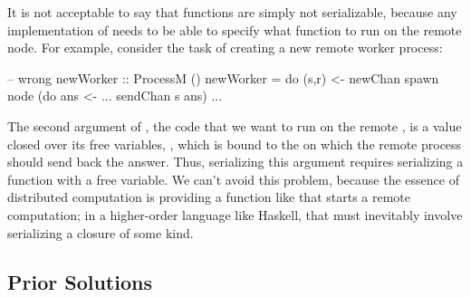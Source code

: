 \documentclass{sigplanconf}
\newcommand\je[1]{\nb{jeff}{#1}}
\begin{document}
It is not acceptable to say that functions are simply not
serializable, because any implementation of  needs to be able to specify what function to run on the remote node.
For example, consider the task of creating a new remote worker process:
\needspace{7ex}
\begin{code}
  -- wrong
  newWorker :: ProcessM ()
  newWorker = do (s,r) <- newChan
                 spawn node (do ans <- ...
                                sendChan s ans)
                 ... 
\end{code}
The second argument of , the code that we want to run on the remote , is a value closed over
its free variables, , which is bound to the  on which
the remote process should send back the answer.
Thus, serializing this argument requires serializing a function with a free variable.
We can't avoid this problem, because the essence of distributed computation is providing a function like  that starts a remote computation; in a higher-order language like Haskell, that must inevitably
involve serializing a closure of some kind.

\subsection{Prior Solutions}
\end{document}
